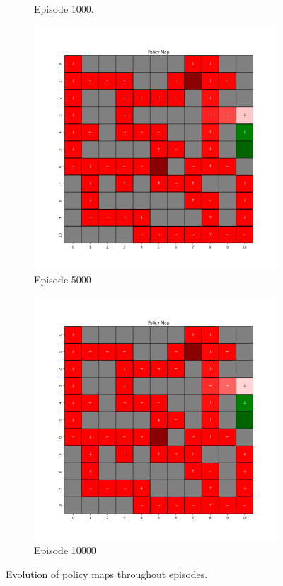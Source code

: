 \documentclass{assignment}
\begin{document}
\begin{figure}[H]
\begin{subfigure}{0.3\textwidth}
    \caption{Episode 1000.}
    \end{subfigure}\hfill
    \begin{subfigure}{0.3\textwidth}
        \includegraphics[width=\textwidth]{figures/policy_q/gamma_sweep/policy_alpha_0.1_gamma_0.5_epsilon_0.2_iteration_5000.png}
    \caption{Episode 5000}
    \end{subfigure}\hfill
    \begin{subfigure}{0.3\textwidth}
        \includegraphics[width=\textwidth]{figures/policy_q/gamma_sweep/policy_alpha_0.1_gamma_0.5_epsilon_0.2_iteration_10000.png}
    \caption{Episode 10000}
    \end{subfigure}
    \caption{Evolution of policy maps throughout episodes.}
    \label{fig:gamma_0.5_q_learning_policy}
\end{figure}
\end{document}
